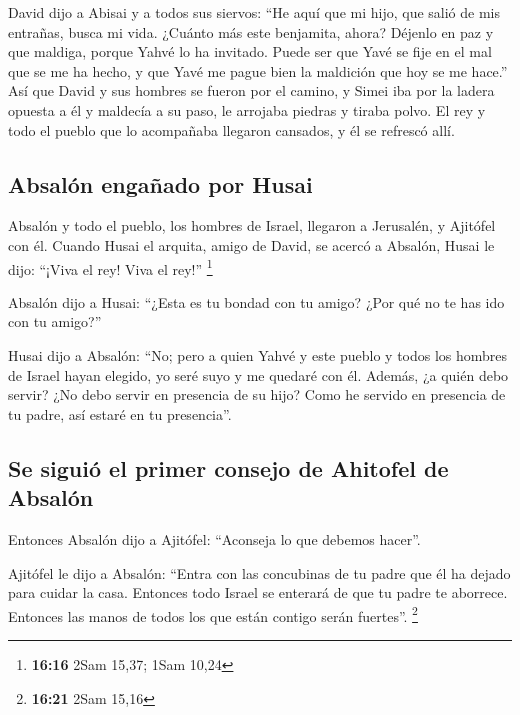  David dijo a Abisai y a todos sus siervos: ``He aquí que
mi hijo, que salió de mis entrañas, busca mi vida. ¿Cuánto más este
benjamita, ahora? Déjenlo en paz y que maldiga, porque Yahvé lo ha
invitado.  Puede ser que Yavé se fije en el mal que se me
ha hecho, y que Yavé me pague bien la maldición que hoy se me hace.''
 Así que David y sus hombres se fueron por el camino, y
Simei iba por la ladera opuesta a él y maldecía a su paso, le arrojaba
piedras y tiraba polvo.  El rey y todo el pueblo que lo
acompañaba llegaron cansados, y él se refrescó allí.

\hypertarget{absaluxf3n-engauxf1ado-por-husai}{%
\subsection{Absalón engañado por
Husai}\label{absaluxf3n-engauxf1ado-por-husai}}

 Absalón y todo el pueblo, los hombres de Israel,
llegaron a Jerusalén, y Ajitófel con él.  Cuando Husai el
arquita, amigo de David, se acercó a Absalón, Husai le dijo: ``¡Viva el
rey! Viva el rey!'' \footnote{\textbf{16:16} 2Sam 15,37; 1Sam 10,24}

 Absalón dijo a Husai: ``¿Esta es tu bondad con tu amigo?
¿Por qué no te has ido con tu amigo?''

 Husai dijo a Absalón: ``No; pero a quien Yahvé y este
pueblo y todos los hombres de Israel hayan elegido, yo seré suyo y me
quedaré con él.  Además, ¿a quién debo servir? ¿No debo
servir en presencia de su hijo? Como he servido en presencia de tu
padre, así estaré en tu presencia''.

\hypertarget{se-siguiuxf3-el-primer-consejo-de-ahitofel-de-absaluxf3n}{%
\subsection{Se siguió el primer consejo de Ahitofel de
Absalón}\label{se-siguiuxf3-el-primer-consejo-de-ahitofel-de-absaluxf3n}}

 Entonces Absalón dijo a Ajitófel: ``Aconseja lo que
debemos hacer''.

 Ajitófel le dijo a Absalón: ``Entra con las concubinas
de tu padre que él ha dejado para cuidar la casa. Entonces todo Israel
se enterará de que tu padre te aborrece. Entonces las manos de todos los
que están contigo serán fuertes''. \footnote{\textbf{16:21} 2Sam 15,16}


